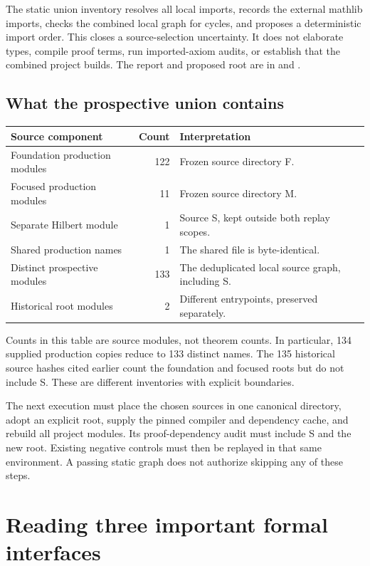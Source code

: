 \documentclass[11pt]{article}
\begin{document}
The static union inventory resolves all local imports, records the external mathlib imports, checks the combined local graph for cycles, and proposes a deterministic import order. This closes a source-selection uncertainty. It does not elaborate types, compile proof terms, run imported-axiom audits, or establish that the combined project builds. The report and proposed root are in  and .

\subsection{What the prospective union contains}
\begin{center}
\begin{tabularx}{\linewidth}{@{}p{.30\linewidth}rp{.51\linewidth}@{}}
\toprule
Source component & Count & Interpretation\\\midrule
Foundation production modules & 122 & Frozen source directory F.\\
Focused production modules & 11 & Frozen source directory M.\\
Separate Hilbert module & 1 & Source S, kept outside both replay scopes.\\
Shared production names & 1 & The shared file is byte-identical.\\
Distinct prospective modules & 133 & The deduplicated local source graph, including S.\\
Historical root modules & 2 & Different entrypoints, preserved separately.\\\bottomrule
\end{tabularx}
\end{center}
Counts in this table are source modules, not theorem counts. In particular, 134 supplied production copies reduce to 133 distinct names. The 135 historical source hashes cited earlier count the foundation and focused roots but do not include S. These are different inventories with explicit boundaries.

The next execution must place the chosen sources in one canonical directory, adopt an explicit root, supply the pinned compiler and dependency cache, and rebuild all project modules. Its proof-dependency audit must include S and the new root. Existing negative controls must then be replayed in that same environment. A passing static graph does not authorize skipping any of these steps.

\clearpage\section{Reading three important formal interfaces}
\end{document}
